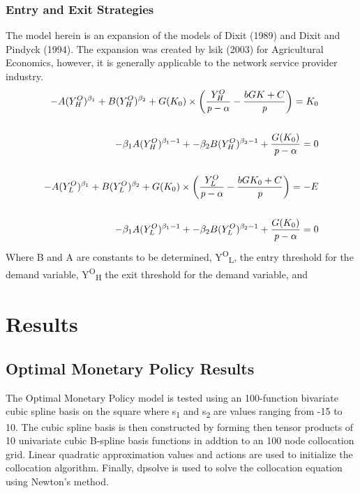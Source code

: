 \documentclass[a4paper,oneside]{article}
\begin{document}
\subsubsection{Entry and Exit Strategies}
	The model herein is an expansion of the models of Dixit (1989) and Dixit and Pindyck (1994). 
The expansion was created by lsik (2003) for Agricultural Economics, however, it is generally applicable to the network service provider industry.
\begin{equation}
	\begin{split}
		-A(Y^O_H)^{\beta_1} + B(Y^O_H)^{\beta_2}  + G(K_0) \times \bigg( \frac{Y^O_H}{\emph{p}-\alpha} -  \frac{bG{K}+C}{\emph{p}}    \bigg) =K_0 
		\\
		\\
		-\beta_1 A (Y^O_H)^{\beta_1-1} + -\beta_2 B (Y^O_H)^{\beta_2-1}  + \frac{G(K_0)}{\emph{p}-\alpha} = 0 
		\\
		\\
		-A(Y^O_L)^{\beta_1} + B(Y^O_L)^{\beta_2} + G(K_0) \times \bigg( \frac{Y^O_L}{\emph{p}-\alpha} -  \frac{bG{K_0}+C}{\emph{p}}    \bigg) = -E
		\\
		\\
		-\beta_1 A (Y^O_L)^{\beta_1-1} + -\beta_2 B (Y^O_L)^{\beta_2-1}  + \frac{G(K_0)}{\emph{p}-\alpha} = 0
	\end{split}
\end{equation}
Where B and A are constants to be determined, Y\textsuperscript{O}\textsubscript{L}, the entry threshold for the demand variable, Y\textsuperscript{O}\textsubscript{H} the exit threshold for the demand variable, and 

\section{Results}\label{sec:res}
\subsection{Optimal Monetary Policy Results}
\:\:\:\:\:\: The Optimal Monetary Policy model is tested using an 100-function bivariate cubic spline basis on the square where s\textsubscript{1} and s\textsubscript{2} are values ranging from -15 to 10. 
The cubic spline basis is then constructed by forming then tensor products of 10 univariate cubic B-spline basis functions in addtion to an 100 node collocation grid.
Linear quadratic approximation values and actions are used to initialize the collocation algorithm. 
Finally, dpsolve is used to solve the collocation equation using Newton's method.
\end{document}
